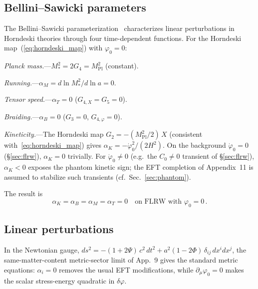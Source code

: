 \documentclass[aps,prd,onecolumn,superscriptaddress,nofootinbib,showpacs,12pt]{revtex4-2}
\newcommand{\Mpl}{M_{\mathrm{Pl}}}
\begin{document}
\subsection{Bellini--Sawicki parameters}\label{sec:bellini}

The Bellini--Sawicki parameterization~\cite{BelliniSawicki2014}
characterizes linear perturbations in Horndeski theories through
four time-dependent functions.  For the Horndeski
map~(\ref{eq:horndeski_map}) with $\varphi_{0} = 0$:

\medskip\noindent
\textit{Planck mass.}---$M_{*}^{2} = 2G_{4} = \Mpl^{2}$
(constant).

\medskip\noindent
\textit{Running.}---$\alpha_{M} = d\ln M_{*}^{2}/d\ln a = 0$.

\medskip\noindent
\textit{Tensor speed.}---$\alpha_{T} = 0$
\;($G_{4,X} = G_{5} = 0$).

\medskip\noindent
\textit{Braiding.}---$\alpha_{B} = 0$
\;($G_{3} = 0$, $G_{4,\varphi} = 0$).

\medskip\noindent
\textit{Kineticity.}---The Horndeski map $G_{2} = -(\Mpl^{2}/2)\,X$
(consistent with~\eqref{eq:horndeski_map})
gives $\alpha_{K} = -\dot{\varphi}_{0}^{2}/(2H^{2})$.
On the background $\dot{\varphi}_{0} = 0$
(\S\ref{sec:flrw}), $\alpha_{K} = 0$ trivially.  For
$\dot{\varphi}_{0} \neq 0$ (e.g.\ the $C_{0} \neq 0$
transient of \S\ref{sec:flrw}), $\alpha_{K} < 0$ exposes
the phantom kinetic sign; the EFT completion of
Appendix~11 is assumed to stabilize such transients
(cf.\ Sec.~\ref{sec:phantom}).

\medskip
The result is
\begin{equation}\label{eq:alphas}
  \boxed{\alpha_{K} = \alpha_{B} = \alpha_{M}
    = \alpha_{T} = 0
    \quad\text{on FLRW with }\varphi_{0}=0\,.}
\end{equation}

\subsection{Linear perturbations}\label{sec:linear_pert}

In the Newtonian gauge,
$ds^{2} = -(1+2\Psi)\,c^{2}\,dt^{2}
+ a^{2}(1-2\Phi)\,\delta_{ij}\,dx^{i}dx^{j}$,
the same-matter-content metric-sector limit of App.~9 gives
the standard metric equations: $\alpha_i = 0$ removes the
usual EFT modifications, while
$\partial_\mu\varphi_0 = 0$ makes the scalar stress-energy
quadratic in $\delta\varphi$.
\end{document}
